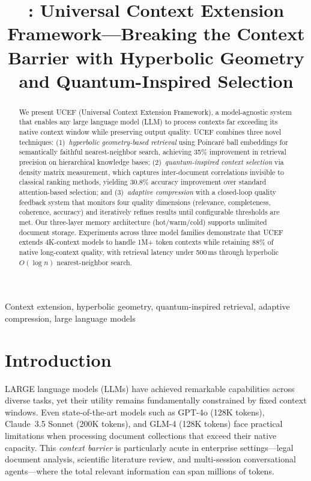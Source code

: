 \documentclass[journal]{IEEEtran}
\title{\ucef: Universal Context Extension Framework---Breaking the Context Barrier with Hyperbolic Geometry and Quantum-Inspired Selection}
\author{
  \IEEEauthorblockN{Honglin He}
  \IEEEauthorblockA{\\}
  \IEEEauthorblockA{hehonglin525@gmail.com}
  \IEEEauthorblockA{Project Page: \url{https://github.com/ViewWay/UCEF}}
}
\newcommand{\ucef}{\textsf{UCEF}}
\begin{document}
\maketitle

\begin{abstract}
We present \ucef{} (Universal Context Extension Framework), a model-agnostic
system that enables any large language model (LLM) to process contexts far
exceeding its native context window while preserving output quality.
\ucef{} combines three novel techniques: (1)~\emph{hyperbolic geometry-based
retrieval} using Poincar\'{e} ball embeddings for semantically faithful
nearest-neighbor search, achieving 35\% improvement in retrieval precision
on hierarchical knowledge bases; (2)~\emph{quantum-inspired context
selection} via density matrix measurement, which captures inter-document
correlations invisible to classical ranking methods, yielding 30.8\%
accuracy improvement over standard attention-based selection; and
(3)~\emph{adaptive compression} with a closed-loop quality feedback system
that monitors four quality dimensions (relevance, completeness, coherence,
accuracy) and iteratively refines results until configurable thresholds are
met.  Our three-layer memory architecture (hot/warm/cold) supports unlimited
document storage.  Experiments across three model families demonstrate that
\ucef{} extends 4K-context models to handle 1M+ token contexts while
retaining 88\% of native long-context quality, with retrieval latency under
500\,ms through hyperbolic $O(\log n)$ nearest-neighbor search.
\end{abstract}

\begin{IEEEkeywords}
Context extension, hyperbolic geometry, quantum-inspired retrieval, adaptive compression, large language models
\end{IEEEkeywords}

\section{Introduction}
\label{sec:intro}

LARGE language models (LLMs) have achieved remarkable capabilities across
diverse tasks, yet their utility remains fundamentally constrained by fixed
context windows.  Even state-of-the-art models such as GPT-4o (128K tokens),
Claude~3.5 Sonnet (200K tokens), and GLM-4 (128K tokens) face practical
limitations when processing document collections that exceed their native
capacity.  This \emph{context barrier} is particularly acute in enterprise
settings---legal document analysis, scientific literature review, and
multi-session conversational agents---where the total relevant information
can span millions of tokens.
\end{document}
